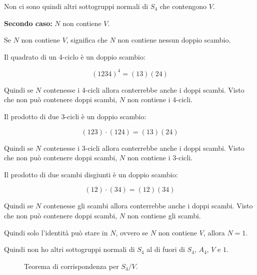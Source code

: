 \begin{soluzione}
	
	Non ci sono quindi altri sottogruppi normali di $S_4$ che contengono $V$.
	
	\textbf{Secondo caso:} $N$ non contiene $V$.
	
	Se $N$ non contiene $V$, significa che $N$ non contiene nessun doppio scambio.
	
	Il quadrato di un 4-ciclo è un doppio scambio:
	
	\begin{equation}
		(1234)^4 = (13)(24)
	\end{equation}
	
	Quindi se $N$ contenesse i 4-cicli allora conterrebbe anche i doppi scambi. Visto che non può contenere doppi scambi, $N$ non contiene i 4-cicli.
	
	Il prodotto di due 3-cicli è un doppio scambio:
	
	\begin{equation}
		(123) \cdot (124) = (13)(24)
	\end{equation}

	Quindi se $N$ contenesse i 3-cicli allora conterrebbe anche i doppi scambi. Visto che non può contenere doppi scambi, $N$ non contiene i 3-cicli.
	
	Il prodotto di due scambi disgiunti è un doppio scambio:
	
	\begin{equation}
		(12)\cdot (34) = (12)(34)
	\end{equation}

	Quindi se $N$ contenesse gli scambi allora conterrebbe anche i doppi scambi. Visto che non può contenere doppi scambi, $N$ non contiene gli scambi.

	Quindi solo l'identità può stare in $N$, ovvero se $N$ non contiene $V$, allora $N = 1$.
	
	Quindi non ho altri sottogruppi normali di $S_4$ al di fuori di $S_4$, $A_4$, $V$ e $1$.
\end{soluzione}
	\begin{figure}[tp]
	\centering
	\caption{Teorema di corrispondenza per $S_4/V$.}
	\label{fig:corrispondenza_per_S4_su_V}
\end{figure}
